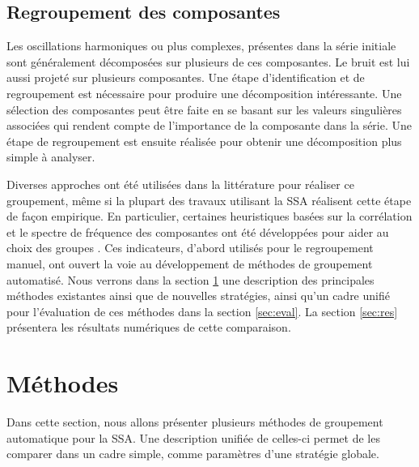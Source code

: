 \documentclass{gretsi}
\def\HH{\mathcal H}
\begin{document}


\subsection{Regroupement des composantes}
\label{sub:grp}

Les oscillations harmoniques ou plus complexes, présentes dans la série initiale sont généralement décomposées sur plusieurs de ces composantes.
Le bruit est lui aussi projeté sur plusieurs composantes.
Une étape d'identification et de regroupement est nécessaire pour produire une décomposition intéressante.
Une sélection des composantes peut être faite en se basant sur les valeurs singulières associées qui rendent compte de l'importance de la composante dans la série.
Une étape de regroupement est ensuite réalisée pour obtenir une décomposition plus simple à analyser.

Diverses approches ont été utilisées dans la littérature pour réaliser ce groupement, même si la plupart des travaux utilisant la SSA réalisent cette étape de façon empirique.
En particulier, certaines heuristiques basées sur la corrélation et le spectre de fréquence des composantes ont été développées pour aider au choix des groupes \cite{Golyandina_10_ssa}.
Ces indicateurs, d'abord utilisés pour le regroupement manuel, ont ouvert la voie au développement de méthodes de groupement automatisé.
Nous verrons dans la section \ref{sec:met} une description des principales méthodes existantes ainsi que de nouvelles stratégies, ainsi qu'un cadre unifié pour l'évaluation de ces méthodes dans la section \ref{sec:eval}.
La section \ref{sec:res} présentera les résultats numériques de cette comparaison.


\section{Méthodes}
\label{sec:met}

Dans cette section, nous allons présenter plusieurs méthodes de groupement automatique pour la SSA.
Une description unifiée de celles-ci permet de les comparer dans un cadre simple, comme paramètres d'une stratégie globale.
\end{document}

